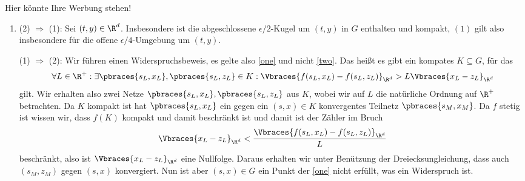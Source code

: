 \begin{solution}
  Hier könnte Ihre Werbung stehen!

  \begin{enumerate}[label = \alph*)]
    \item 
    (2) $\Rightarrow$ (1): Sei $(t, y) \in \R^d$.
    Insbesondere ist die abgeschlossene $\epsilon /2$-Kugel um $(t,y)$ in $G$ enthalten und kompakt, $(1)$ gilt also insbesondere für die offene $\epsilon /4$-Umgebung um $(t,y)$.

    (1) $\Rightarrow$ (2):
    Wir führen einen Widerspruchsbeweis, es gelte also \ref{one} und nicht \ref{two}. Das heißt es gibt ein kompates $K \subseteq G$, für das 
    \begin{align*}
      \forall L \in \R^+: \exists \pbraces{s_L,x_L}, \pbraces{s_L, z_L} \in K: \Vbraces{f(s_L,x_L) - f(s_L,z_L)}_{\R^d} > L \Vbraces{x_L - z_L}_{\R^d}
    \end{align*}
    gilt. Wir erhalten also zwei Netze $\pbraces{s_L,x_L}, \pbraces{s_L, z_L}$ aus $K$, wobei wir auf $L$ die natürliche Ordnung auf $\R^+$ betrachten. Da $K$ kompakt ist hat $\pbraces{s_L,x_L}$ ein gegen ein $(s,x) \in K$ konvergentes Teilnetz $\pbraces{s_M, x_M}$. Da $f$ stetig ist wissen wir, dass $f(K)$ kompakt und damit beschränkt ist und damit ist der Zähler im Bruch
    \begin{align*}
      \Vbraces{x_L - z_L}_{\R^d} < \frac{\Vbraces{f(s_L,x_L) - f(s_L,z_L)}_{\R^d}}{L}
    \end{align*}
    beschränkt, also ist $\Vbraces{x_L - z_L}_{\R^d}$ eine Nullfolge. Daraus erhalten wir unter Benützung der Dreiecksungleichung, dass auch $(s_M,z_M)$ gegen $(s,x)$ konvergiert. Nun ist aber $(s,x) \in G$ ein Punkt der \ref{one} nicht erfüllt, was ein Widerspruch ist.


\end{enumerate}
\end{solution}
